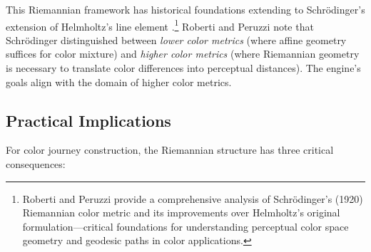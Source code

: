 This Riemannian framework has historical foundations extending to Schrödinger's extension of Helmholtz's line element \citep{roberti2023}.\footnote{Roberti and Peruzzi provide a comprehensive analysis of Schrödinger's (1920) Riemannian color metric and its improvements over Helmholtz's original formulation—critical foundations for understanding perceptual color space geometry and geodesic paths in color applications.} Roberti and Peruzzi \citeyearpar{roberti2023} note that Schrödinger distinguished between \emph{lower color metrics} (where affine geometry suffices for color mixture) and \emph{higher color metrics} (where Riemannian geometry is necessary to translate color differences into perceptual distances). The engine's goals align with the domain of higher color metrics.

\subsection{Practical Implications}

For color journey construction, the Riemannian structure has three critical consequences:

